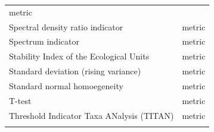\documentclass[12pt,twoside,openany]{reedthesis}
\begin{document}
\begin{longtable}[]{@{}lc@{}}
\begin{minipage}[t]{0.35\columnwidth}
metric\strut
\end{minipage}\tabularnewline
\begin{minipage}[t]{0.31\columnwidth}\raggedright
Spectral density
ratio indicator\strut
\end{minipage} & \begin{minipage}[t]{0.35\columnwidth}\centering
metric\strut
\end{minipage}\tabularnewline
\begin{minipage}[t]{0.31\columnwidth}\raggedright
Spectrum
indicator\strut
\end{minipage} & \begin{minipage}[t]{0.35\columnwidth}\centering
metric\strut
\end{minipage}\tabularnewline
\begin{minipage}[t]{0.31\columnwidth}\raggedright
Stability Index
of the
Ecological Units\strut
\end{minipage} & \begin{minipage}[t]{0.35\columnwidth}\centering
metric\strut
\end{minipage}\tabularnewline
\begin{minipage}[t]{0.31\columnwidth}\raggedright
Standard
deviation
(rising
variance)\strut
\end{minipage} & \begin{minipage}[t]{0.35\columnwidth}\centering
metric\strut
\end{minipage}\tabularnewline
\begin{minipage}[t]{0.31\columnwidth}\raggedright
Standard normal
homoegeneity\strut
\end{minipage} & \begin{minipage}[t]{0.35\columnwidth}\centering
metric\strut
\end{minipage}\tabularnewline
\begin{minipage}[t]{0.31\columnwidth}\raggedright
T-test\strut
\end{minipage} & \begin{minipage}[t]{0.35\columnwidth}\centering
metric\strut
\end{minipage}\tabularnewline
\begin{minipage}[t]{0.31\columnwidth}\raggedright
Threshold
Indicator Taxa
ANalysis (TITAN)\strut
\end{minipage} & \begin{minipage}[t]{0.35\columnwidth}\centering
metric\strut
\end{minipage}\tabularnewline
\begin{minipage}[t]{0.31\columnwidth}\raggedright

\end{minipage}
\end{longtable}
\end{document}
